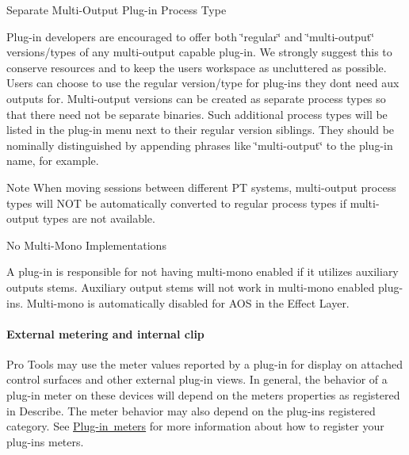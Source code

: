\begin{DoxyItemize}
\item  Separate Multi-\/\+Output Plug-\/in Process Type

Plug-\/in developers are encouraged to offer both \char`\"{}regular\char`\"{} and \char`\"{}multi-\/output\char`\"{} versions/types of any multi-\/output capable plug-\/in. We strongly suggest this to conserve resources and to keep the user\textquotesingle{}s workspace as uncluttered as possible. Users can choose to use the regular version/type for plug-\/ins they don\textquotesingle{}t need aux outputs for. Multi-\/output versions can be created as separate process types so that there need not be separate binaries. Such additional process types will be listed in the plug-\/in menu next to their regular version siblings. They should be nominally distinguished by appending phrases like \char`\"{}multi-\/output\char`\"{} to the plug-\/in name, for example.

\begin{DoxyNote}{Note}
When moving sessions between different PT systems, multi-\/output process types will N\+OT be automatically converted to regular process types if multi-\/output types are not available.
\end{DoxyNote}



\item  No Multi-\/\+Mono Implementations

A plug-\/in is responsible for not having multi-\/mono enabled if it utilizes auxiliary outputs stems. Auxiliary output stems will not work in multi-\/mono enabled plug-\/ins. Multi-\/mono is automatically disabled for A\+OS in the Effect Layer. 
\end{DoxyItemize}

\hypertarget{a00830_subsubsection__external_metering_and_internal_clip_}{}\paragraph{External metering and internal clip}\label{a00830_subsubsection__external_metering_and_internal_clip_}
 Pro Tools may use the meter values reported by a plug-\/in for display on attached control surfaces and other external plug-\/in views. In general, the behavior of a plug-\/in meter on these devices will depend on the meter\textquotesingle{}s properties as registered in Describe. The meter behavior may also depend on the plug-\/in\textquotesingle{}s registered category. See \mbox{\hyperlink{a00807}{Plug-\/in meters}} for more information about how to register your plug-\/in\textquotesingle{}s meters.


